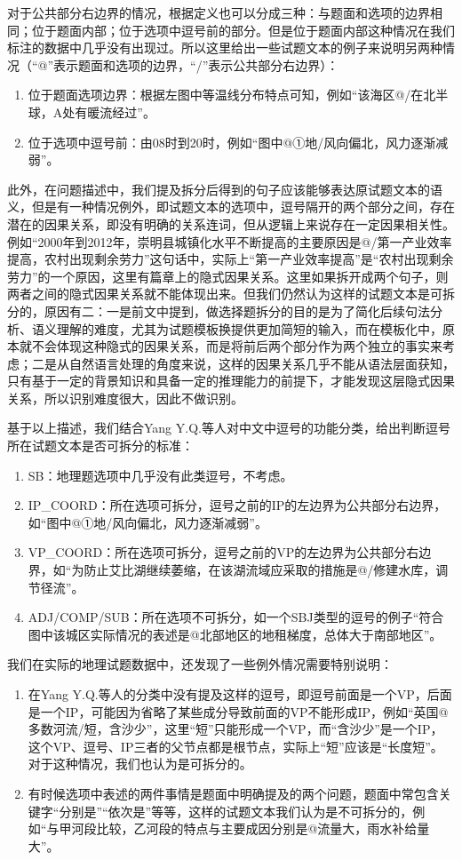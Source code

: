 \documentclass[master, winfont]{njuthesis}
\begin{document}
对于公共部分右边界的情况，根据定义也可以分成三种：与题面和选项的边界相同；位于题面内部；位于选项中逗号前的部分。但是位于题面内部这种情况在我们标注的数据中几乎没有出现过。所以这里给出一些试题文本的例子来说明另两种情况（“@”表示题面和选项的边界，“/”表示公共部分右边界）：
\begin{enumerate}
  \item 位于题面选项边界：根据左图中等温线分布特点可知，例如“该海区@/在北半球，A处有暖流经过”。
  \item 位于选项中逗号前：由08时到20时，例如“图中@①地/风向偏北，风力逐渐减弱”。
\end{enumerate}

此外，在问题描述中，我们提及拆分后得到的句子应该能够表达原试题文本的语义，但是有一种情况例外，即试题文本的选项中，逗号隔开的两个部分之间，存在潜在的因果关系，即没有明确的关系连词，但从逻辑上来说存在一定因果相关性。例如“2000年到2012年，崇明县城镇化水平不断提高的主要原因是@/第一产业效率提高，农村出现剩余劳力”这句话中，实际上“第一产业效率提高”是“农村出现剩余劳力”的一个原因，这里有篇章上的隐式因果关系\cite{liyancui2015}。这里如果拆开成两个句子，则两者之间的隐式因果关系就不能体现出来。但我们仍然认为这样的试题文本是可拆分的，原因有二：一是前文中提到，做选择题拆分的目的是为了简化后续句法分析、语义理解的难度，尤其为试题模板换提供更加简短的输入，而在模板化中，原本就不会体现这种隐式的因果关系，而是将前后两个部分作为两个独立的事实来考虑；二是从自然语言处理的角度来说，这样的因果关系几乎不能从语法层面获知，只有基于一定的背景知识和具备一定的推理能力的前提下，才能发现这层隐式因果关系，所以识别难度很大，因此不做识别。

基于以上描述，我们结合Yang Y.Q.等人\cite{Yang2012Chinese}对中文中逗号的功能分类，给出判断逗号所在试题文本是否可拆分的标准：
\begin{enumerate}
  \item SB：地理题选项中几乎没有此类逗号，不考虑。
  \item IP\_COORD：所在选项可拆分，逗号之前的IP的左边界为公共部分右边界，如“图中@①地/风向偏北，风力逐渐减弱”。
  \item VP\_COORD：所在选项可拆分，逗号之前的VP的左边界为公共部分右边界，如“为防止艾比湖继续萎缩，在该湖流域应采取的措施是@/修建水库，调节径流”。
  \item ADJ/COMP/SUB：所在选项不可拆分，如一个SBJ类型的逗号的例子“符合图中该城区实际情况的表述是@北部地区的地租梯度，总体大于南部地区”。
\end{enumerate}

我们在实际的地理试题数据中，还发现了一些例外情况需要特别说明：
\begin{enumerate}
  \item 在Yang Y.Q.等人的分类中没有提及这样的逗号，即逗号前面是一个VP，后面是一个IP，可能因为省略了某些成分导致前面的VP不能形成IP，例如“英国@多数河流/短，含沙少”，这里“短”只能形成一个VP，而“含沙少”是一个IP，这个VP、逗号、IP三者的父节点都是根节点，实际上“短”应该是“长度短”。对于这种情况，我们也认为是可拆分的。
  \item 有时候选项中表述的两件事情是题面中明确提及的两个问题，题面中常包含关键字“分别是”“依次是”等等，这样的试题文本我们认为是不可拆分的，例如“与甲河段比较，乙河段的特点与主要成因分别是@流量大，雨水补给量大”。
\end{enumerate}
\end{document}
